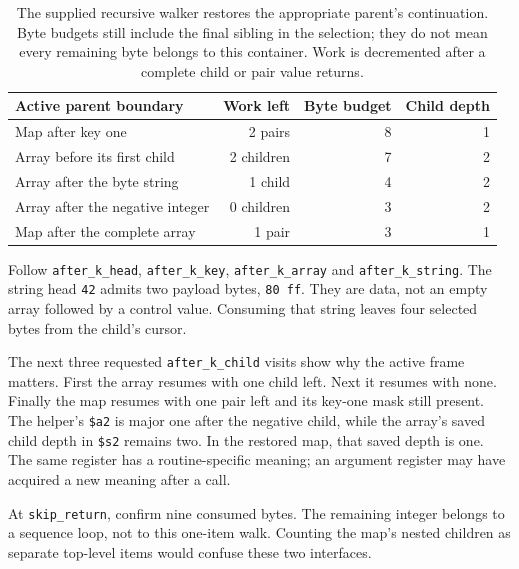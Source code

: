 \begin{table}[htbp]
  \centering
  \begin{tabular}{l r r r}
    \toprule
    Active parent boundary           & Work left  & Byte budget & Child depth \\
    \midrule
    Map after key one                & 2 pairs    & 8           & 1           \\
    Array before its first child     & 2 children & 7           & 2           \\
    Array after the byte string      & 1 child    & 4           & 2           \\
    Array after the negative integer & 0 children & 3           & 2           \\
    Map after the complete array     & 1 pair     & 3           & 1           \\
    \bottomrule
  \end{tabular}
  \caption{The supplied recursive walker restores the appropriate parent's
    continuation. Byte budgets still include the final sibling in the selection;
    they do not mean every remaining byte belongs to this container. Work is decremented
    after a complete child or pair value returns.}
  \label{tab:revision-cbor-lab-continuations}
\end{table}

Follow \texttt{after\_k\_head}, \texttt{after\_k\_key},
\texttt{after\_k\_array} and \texttt{after\_k\_string}. The string head
\texttt{42} admits two payload bytes, \texttt{80 ff}. They are data, not an
empty array followed by a control value. Consuming that string leaves four
selected bytes from the child's cursor.

The next three requested \texttt{after\_k\_child} visits show why the active
frame matters. First the array resumes with one child left. Next it resumes
with none. Finally the map resumes with one pair left and its key-one mask
still present. The helper's \texttt{\$a2} is major one after the negative child,
while the array's saved child depth in \texttt{\$s2} remains two. In the restored
map, that saved depth is one. The same register has a routine-specific meaning;
an argument register may have acquired a new meaning after a call.

At \texttt{skip\_return}, confirm nine consumed bytes. The remaining integer
belongs to a sequence loop, not to this one-item walk. Counting the map's nested
children as separate top-level items would confuse these two interfaces.

